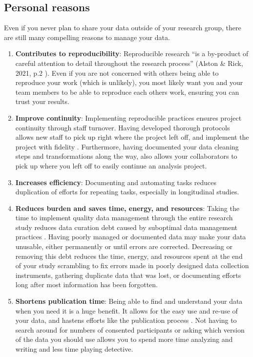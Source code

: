 \documentclass[
]{book}
\begin{document}
\hypertarget{personal-reasons}{%
\subsection{Personal reasons}\label{personal-reasons}}

Even if you never plan to share your data outside of your research group, there are still many compelling reasons to manage your data.

\begin{enumerate}
\def\labelenumi{\arabic{enumi}.}
\item
  \textbf{Contributes to reproducibility}: Reproducible research ``is a by-product of careful attention to detail throughout the research process'' (Alston \& Rick, 2021, p.2 \autocite{alston_beginners_2021}). Even if you are not concerned with others being able to reproduce your work (which is unlikely), you most likely want you and your team members to be able to reproduce each others work, ensuring you can trust your results.
\item
  \textbf{Improve continuity}: Implementing reproducible practices ensures project continuity through staff turnover. Having developed thorough protocols allows new staff to pick up right where the project left off, and implement the project with fidelity \autocite{borghi_data_2021,cowles_research_nodate,markowetz_five_2015}. Furthermore, having documented your data cleaning steps and transformations along the way, also allows your collaborators to pick up where you left off to easily continue an analysis project.
\item
  \textbf{Increases efficiency}: Documenting and automating tasks reduces duplication of efforts for repeating tasks, especially in longitudinal studies.
\item
  \textbf{Reduces burden and saves time, energy, and resources}: Taking the time to implement quality data management through the entire research study reduces data curation debt caused by suboptimal data management practices \autocite{butters_recognizing_2020}. Having poorly managed or documented data may make your data unusable, either permanently or until errors are corrected. Decreasing or removing this debt reduces the time, energy, and resources spent at the end of your study scrambling to fix errors made in poorly designed data collection instruments, gathering duplicate data that was lost, or documenting efforts long after most information has been forgotten.
\item
  \textbf{Shortens publication time}: Being able to find and understand your data when you need it is a huge benefit. It allows for the easy use and re-use of your data, and hastens efforts like the publication process \autocite{markowetz_five_2015}. Not having to search around for numbers of consented participants or asking which version of the data you should use allows you to spend more time analyzing and writing and less time playing detective.

\end{enumerate}
\end{document}

